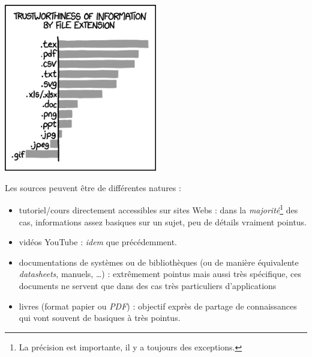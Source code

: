 \documentclass[../../../main.tex]{subfiles}
\begin{document}
\begin{minipage}{\textwidth}
	\begin{center}
		\includegraphics[width=0.5\textwidth]{file_extensions}
	\end{center}
\end{minipage}

Les sources peuvent être de différentes natures :
\begin{itemize}
	\item tutoriel/cours directement accessibles sur sites Webs : dans la \textit{majorité}\footnote{La précision est importante, il y a toujours des exceptions.} des cas, informations assez basiques sur un sujet, peu de détails vraiment pointus.
	\item vidéos YouTube : \textit{idem} que précédemment.
	\item documentations de systèmes ou de bibliothèques (ou de manière équivalente \textit{datasheets}, manuels, \dots) : extrêmement pointus mais aussi très spécifique, ces documents ne servent que dans des cas très particuliers d'applications
	\item livres (format papier ou \textit{PDF}) : objectif exprès de partage de connaissances qui vont souvent de basiques à très pointus.
\end{itemize}
\end{document}
